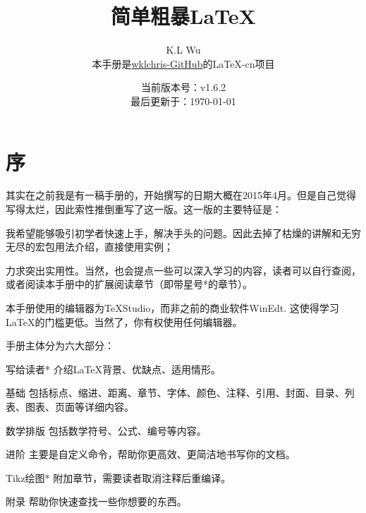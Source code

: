 

\title{简单粗暴\LaTeX }
\author{K.L Wu\\
  {\kaishu 本手册是\href{https://github.com/wklchris/Note-by-LaTeX}{wklchris-GitHub}的\LaTeX{}-cn项目}
}
\date{当前版本号：v1.6.2\\
  最后更新于：\today}



\maketitle

\setlength{\lineskiplimit}{0pt}
\tableofcontents
\setlength{\lineskiplimit}{3pt}

\chapter{序}

\dpar\dpar

其实在之前我是有一稿手册的，开始撰写的日期大概在2015年4月。但是自己觉得写得太烂，因此索性推倒重写了这一版。这一版的主要特征是：
\begin{feae}
  \item 我希望能够吸引初学者快速上手，解决手头的问题。因此去掉了枯燥的讲解和无穷无尽的宏包用法介绍，直接使用实例；
  \item 力求突出实用性。当然，也会提点一些可以深入学习的内容，读者可以自行查阅，或者阅读本手册中的扩展阅读章节（即带星号*的章节）。
  \item 本手册使用的编辑器为\TeX Studio，而非之前的商业软件WinEdt. 这使得学习\LaTeX 的门槛更低。当然了，你有权使用任何编辑器。
\end{feae}

手册主体分为六大部分\cite{LHY2013latex,lamport1986document,mittelbach2004latex,partl2016,Casteleyn2016tikz}：
\begin{fead}
\item[写给读者*] 介绍\LaTeX 背景、优缺点、适用情形。
\item[基础] 包括标点、缩进、距离、章节、字体、颜色、注释、引用、封面、目录、列表、图表、页面等详细内容。
\item[数学排版] 包括数学符号、公式、编号等内容。
\item[进阶] 主要是自定义命令，帮助你更高效、更简洁地书写你的文档。
\item[Tikz绘图*] 附加章节，需要读者取消注释后重编译。
\item[附录] 帮助你快速查找一些你想要的东西。
\end{fead}

